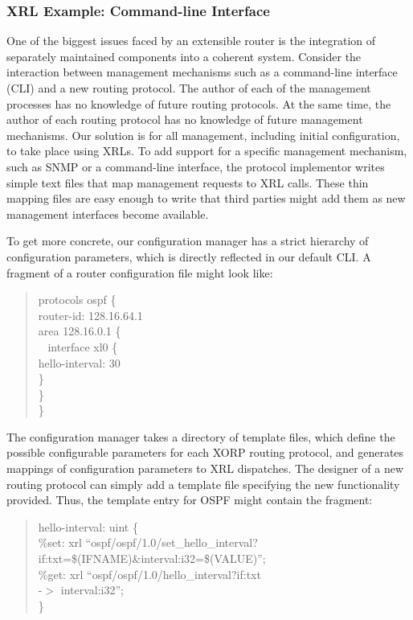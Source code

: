 \subsubsection{XRL Example: Command-line Interface}

One of the biggest issues faced by an {extensible} router is 
the integration of separately maintained components into a coherent
system.  Consider the interaction between management mechanisms such
as a command-line interface (CLI) and a new routing protocol.  The
author of each of the management processes has no knowledge of future
routing protocols.  At the same time, the author of each routing
protocol has no knowledge of future management mechanisms. Our
solution is for all management, including initial configuration, to
take place using XRLs.  To add support for a specific management
mechanism, such as SNMP or a command-line interface, the protocol
implementor writes simple text files that map management requests to
XRL calls.  These thin mapping files are easy enough to write that
third parties might add them as new management interfaces become
available.

To get more concrete, our configuration manager has a strict hierarchy
of configuration parameters, which is directly reflected in our
default CLI.  A fragment of a router configuration file might look
like:

\begin{quotation}
\noindent \sf \small protocols ospf \{\\
\parindent 10pt 
\indent     router-id: 128.16.64.1\\
\indent     area 128.16.0.1 \{\\\
\parindent 20pt 
\indent       interface xl0 \{\\
\parindent 30pt 
\indent         hello-interval: 30\\
\parindent 20pt 
\indent       \}\\
\parindent 10pt 
\indent     \}\\
\}
\end{quotation}

The configuration manager takes a directory of template files, which
define the possible configurable parameters for each XORP routing
protocol, and generates mappings of configuration parameters to XRL
dispatches.  The designer of a new routing protocol can simply add a
template file specifying the new functionality provided.  Thus, the
template entry for OSPF might contain the fragment:

\begin{quotation}
\noindent \sf \small hello-interval: uint \{ \\
\parindent 10pt 
\indent \%set: xrl ``ospf/ospf/1.0/set\_hello\_interval?\\
\parindent 60pt 
\indent if:txt=\$(IFNAME)\&interval:i32=\$(VALUE)'';\\
\parindent 10pt 
\indent \%get: xrl ``ospf/ospf/1.0/hello\_interval?if:txt\\
\parindent 60pt 
\indent -$>$ interval:i32'';\\
\}
\end{quotation}

